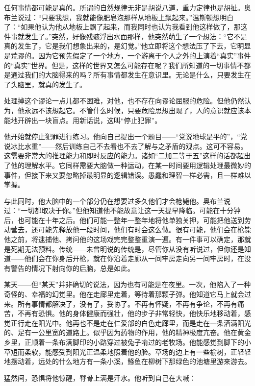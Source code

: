 任何事情都可能是真的。所谓的自然规律无非是胡说八道，重力定律也是胡扯。奥布兰说过：``只要我想，我就能像肥皂泡那样从地板上飘起来。''温斯顿想明白了：``如果他认为他从地板上飘了起来，而我同时也认为我看到他这样做了，那这件事就发生了。''突然，好像残骸浮出水面那样，他突然萌生了一个想法：``它不是真的发生了，它是我们想象出来的，是幻觉。''他立即将这个想法压了下去，它明显是荒谬的。因为它预先假定了一个地方，一个游离于个人之外的上演着``真实''事件的``真实''世界。但是，这样的世界又怎么可能存在呢？我们所知道的一切事情不都是通过我们的大脑得来的吗？所有事情都发生在意识里。无论是什么，只要发生在了头脑里，就真的发生了。

处理掉这个谬论一点儿都不困难，对他，也不存在向谬论屈服的危险。但他仍然认为，他永远不该想起它。不管什么时候，只要危险思想出现了，人的意识就应该本能地开辟出一块盲点。用新话说，这叫``停止犯罪''。

他开始就停止犯罪进行练习。他向自己提出一个题目------``党说地球是平的''，``党说冰比水重''------然后训练自己不去看也不去了解与之矛盾的观点。这可不容易。这需要非常大的推理能力和即时反应的能力。诸如``二加二等于五''这样的话都超出了他的理解水平。它同样需要大脑做一种运动，在某一时间要用逻辑处理最微妙的事件，但接下来又要忽略掉最明显的逻辑错误。愚蠢和理智一样必需，且一样难以掌握。

与此同时，他大脑中的一个部分仍在想要过多久他们才会枪毙他。奥布兰说过：``一切都取决于你。''但他知道他不能故意让这一天提早降临。可能在十分钟后，也可能在十年之后。他们可能一整年一整年地将他单独关押，可能把他送到劳动营去，还可能先释放他一段时间，他们有时会这么做。很有可能，他们会在枪毙他之前，将逮捕他、拷问他的这场戏完完整整重演一遍。有一件事可以确定，那就是死期无法预料。传统------未曾明说的传统是，尽管你从没有听说过，但你还是知道------他们会在你身后开枪，就在你沿着走廊从一间牢房走向另一间牢房时，在没有警告的情况下射向你的后脑，总是如此。

某天------但``某天''并非确切的说法，因为也有可能是在夜里。一次，他陷入了一种奇怪的、幸福的幻觉里。他在走廊里走着，等待着那颗子弹。他知道它马上就会过来。所有事情都解决了，没有了，妥协了。不再有怀疑，不再有争论，不再有痛苦，不再有恐惧。他的身体健康而强壮，他的步子非常轻快，他快乐地移动着，感觉正行走在阳光中。他再也不是走在仁爱部的白色走廊里，而是走在一条洒满阳光的、足有一公里宽的道路上。似乎因为药物的作用，他的精神极度亢奋。他在黄金乡里，正顺着一条布满脚印的小路穿过被兔子啃过的老牧场。他能感觉到脚下的小草短而柔软，能感受到阳光正温柔地照着他的脸。草场的边上有一些榆树，正轻轻地摆动着，远处的什么地方有一条小溪，鲦鱼在柳树下那绿色的池塘里游来游去。

猛然间，恐惧将他惊醒，脊骨上满是汗水。他听到自己在大喊：

